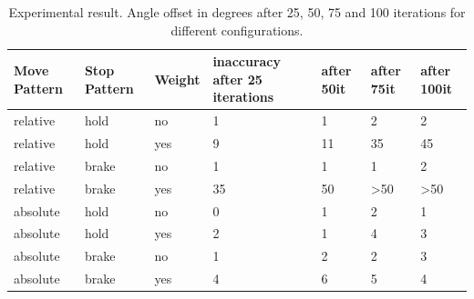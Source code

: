 \documentclass[11pt, a4paper]{article}
\begin{document}
\begin{table}[H]
	\centering
	\begin{tabular}{|l|l|l|l|l|l|l|}
		\hline
		Move Pattern & Stop Pattern & Weight & inaccuracy after 25 iterations & after 50it & after 75it             & after 100it            \\ \hline \hline
		relative   & hold         & no     & 1\degree             & 1\degree    & 2\degree                & 2\degree                \\ \hline
		relative   & hold         & yes    & 9\degree             & 11\degree   & 35\degree               & 45\degree               \\ \hline
		relative   & brake        & no     & 1\degree             & 1\degree    & 1\degree                & 2\degree                \\ \hline
		relative   & brake        & yes    & 35\degree            & 50\degree   & \textgreater{}50\degree & \textgreater{}50\degree \\ \hline
		absolute     & hold         & no     & 0\degree             & 1\degree    & 2\degree                & 1\degree                \\ \hline
		absolute     & hold         & yes    & 2\degree             & 1\degree    & 4\degree                & 3\degree                \\ \hline
		absolute     & brake        & no     & 1\degree             & 2\degree    & 2\degree                & 3\degree                \\ \hline
		absolute     & brake        & yes    & 4\degree             & 6\degree    & 5\degree                & 4\degree                \\ \hline
	\end{tabular}
	\caption{Experimental result. Angle offset in degrees after 25, 50, 75 and 100 iterations for different configurations.}
	\label{tab:angle_experiment}
\end{table}
\end{document}
